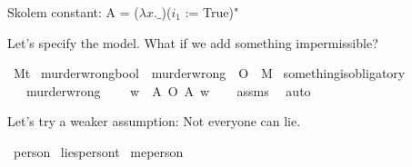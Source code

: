 \begin{isabellebody}
{  Skolem constant:
    A = ($\lambda x. \_$)($i_1$ := True)"%
}\isanewline
%
\isanewline
%
%
\endisatagproof
{\isafoldproof}%
%
\isadelimproof
%
\endisadelimproof
%
\isadelimdocument
%
\endisadelimdocument
%
\isatagdocument
%
\isamarkuptrue%
%
\endisatagdocument
{\isafolddocument}%
%
\isadelimdocument
%
\endisadelimdocument
%
\begin{isamarkuptext}%
Let's specify the model. What if we add something impermissible?%
\end{isamarkuptext}\isamarkuptrue%
\isamarkupfalse%
\ M{\isacharcolon}{\isacharcolon}{\isachardoublequoteopen}t{\isachardoublequoteclose}\isanewline
{}\isamarkupfalse%
\ murder{\isacharunderscore}wrong{\isacharcolon}{\isacharcolon}{\isachardoublequoteopen}bool{\isachardoublequoteclose}\ \ {\isachardoublequoteopen}murder{\isacharunderscore}wrong\ {\isasymequiv}\ {\isasymTurnstile}{\isacharparenleft}O\ {\isacharbraceleft}\isactrlbold {\isasymnot}\ M{\isacharbraceright}{\isacharparenright}{\isachardoublequoteclose}\isanewline
\isanewline
{}\isamarkupfalse%
\ something{\isacharunderscore}is{\isacharunderscore}obligatory{\isacharunderscore}{}{\isacharcolon}\isanewline
\ \ \ murder{\isacharunderscore}wrong\isanewline
\ \ \ {\isachardoublequoteopen}{\isasymforall}\ w{\isachardot}\ {\isasymexists}\ A{\isachardot}\ O\ {\isacharbraceleft}A{\isacharbraceright}\ w{\isachardoublequoteclose}\isanewline
%
\isadelimproof
\ \ %
\endisadelimproof
%
\isatagproof
{}\isamarkupfalse%
\ assms\ \isamarkupfalse%
\ auto\isanewline
%
%
\endisatagproof
{\isafoldproof}%
%
\isadelimproof
%
\endisadelimproof
%
\begin{isamarkuptext}%
Let's try a weaker assumption: Not everyone can lie.%
\end{isamarkuptext}\isamarkuptrue%
\isamarkupfalse%
\ person\isanewline
{}\isamarkupfalse%
\ lies{\isacharcolon}{\isacharcolon}{\isachardoublequoteopen}person{\isasymRightarrow}t{\isachardoublequoteclose}\isanewline
{}\isamarkupfalse%
\ me{\isacharcolon}{\isacharcolon}{\isachardoublequoteopen}person{\isachardoublequoteclose}\isanewline

\end{isabellebody}
